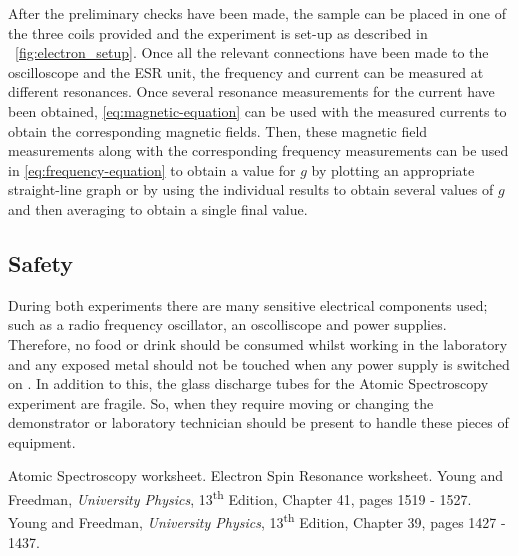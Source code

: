 \documentclass{article}
\newcommand{\figref}[2][\figurename~]{#1\ref{#2}}
\begin{document}
\vspace{2mm}
\noindent
After the preliminary checks have been made, the sample can be placed in one of the three coils provided and the experiment is set-up as described in \figref{fig:electron_setup}. Once all the relevant connections have been made to the oscilloscope and the ESR unit, the frequency and current can be measured at different resonances. Once several resonance measurements for the current have been obtained, \eqref{eq:magnetic-equation} can be used with the measured currents to obtain the corresponding magnetic fields. Then, these magnetic field measurements along with the corresponding frequency measurements can be used in \eqref{eq:frequency-equation} to obtain a value for $g$ by plotting an appropriate straight-line graph or by using the individual results to obtain several values of $g$ and then averaging to obtain a single final value.

\subsection{Safety}
\label{ssec:safety}
During both experiments there are many sensitive electrical components used; such as a radio frequency oscillator, an oscolliscope and power supplies. Therefore, no food or drink should be consumed whilst working in the laboratory and any exposed metal should not be touched when any power supply is switched on \cite{Paper01}. In addition to this,  the glass discharge tubes for the Atomic Spectroscopy experiment are fragile. So, when they require moving or changing the demonstrator or laboratory technician should be present to handle these pieces of equipment. 












\begin{thebibliography}{9}
 Atomic Spectroscopy worksheet.
 Electron Spin Resonance worksheet. 
 Young and Freedman, \textit{University Physics}, 13\textsuperscript{th} Edition, Chapter 41, pages 1519 - 1527.
 Young and Freedman, \textit{University Physics}, 13\textsuperscript{th} Edition, Chapter 39, pages 1427 - 1437.
\end{thebibliography}
\end{document}
